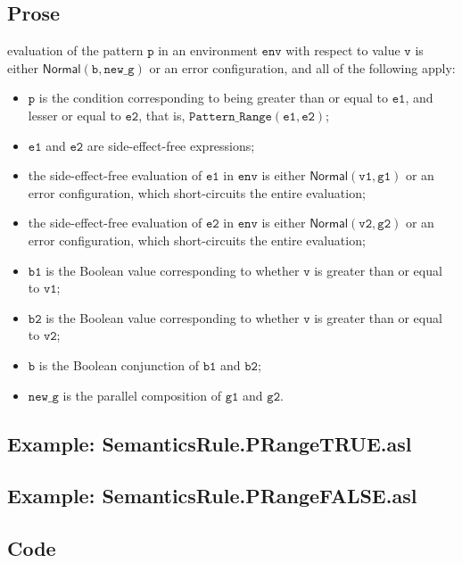 \documentclass{book}
\newcommand\ProseOrError[0]{or an error configuration, which short-circuits the entire evaluation}
\newcommand\Normal[0]{\textsf{Normal}}
\newcommand\env[0]{\texttt{env}}
\newcommand\newg[0]{\texttt{new\_g}}
\newcommand\vp[0]{\texttt{p}}
\newcommand\vv[0]{\texttt{v}}
\newcommand\vvone[0]{\texttt{v1}}
\newcommand\vvtwo[0]{\texttt{v2}}
\newcommand\veone[0]{\texttt{e1}}
\newcommand\vetwo[0]{\texttt{e2}}
\newcommand\vgone[0]{\texttt{g1}}
\newcommand\vgtwo[0]{\texttt{g2}}
\newcommand\vb[0]{\texttt{b}}
\newcommand\vbone[0]{\texttt{b1}}
\newcommand\vbtwo[0]{\texttt{b2}}
\begin{document}
    \subsection{Prose}
    evaluation of the pattern $\vp$ in an environment $\env$ with
    respect to value $\vv$ is either $\Normal(\vb, \newg)$ or an error configuration,
    and all of the following apply:
    \begin{itemize}
      \item $\vp$ is the condition corresponding to being greater than or equal
        to $\veone$, and lesser or equal to $\vetwo$, that is, $\texttt{Pattern\_Range}(\veone, \vetwo)$;
      \item $\veone$ and $\vetwo$ are side-effect-free expressions;
      \item the side-effect-free evaluation of $\veone$ in $\env$ is either $\Normal(\vvone, \vgone)$ \ProseOrError;
      \item the side-effect-free evaluation of $\vetwo$ in $\env$ is either $\Normal(\vvtwo, \vgtwo)$ \ProseOrError;
      \item $\vbone$ is the Boolean value corresponding to whether
        $\vv$ is greater than or equal to $\vvone$;
        \item $\vbtwo$ is the Boolean value corresponding to whether
        $\vv$ is greater than or equal to $\vvtwo$;
      \item $\vb$ is the Boolean conjunction of $\vbone$ and
      $\vbtwo$;
      \item $\newg$ is the parallel composition of $\vgone$ and $\vgtwo$.
    \end{itemize}

    \subsection{Example: SemanticsRule.PRangeTRUE.asl}

    \subsection{Example: SemanticsRule.PRangeFALSE.asl}

  \subsection{Code}
\end{document}
